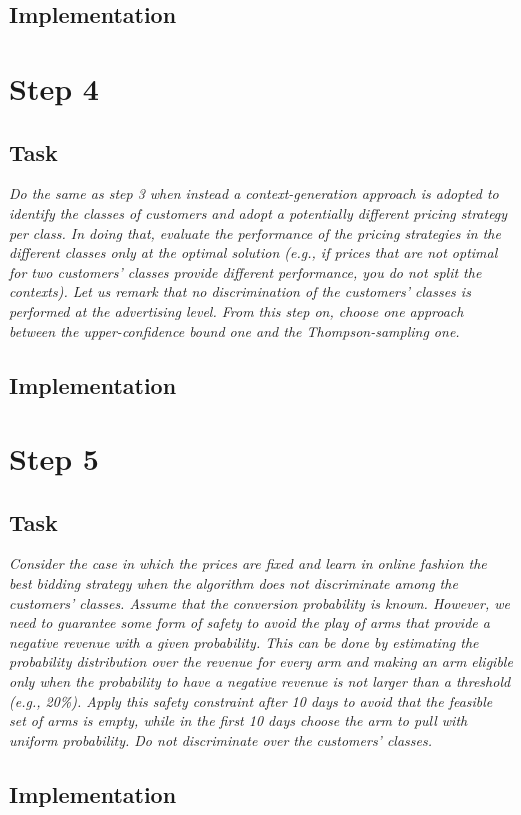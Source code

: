 \documentclass[12pt,a4paper]{report}
\begin{document}
			\subsection{Implementation}

		\section{Step 4}
			\subsection{Task}
\textit{Do the same as step 3 when instead a context-generation approach is adopted to identify the classes of customers and adopt a potentially different pricing strategy per class. In doing that, evaluate the performance of the pricing strategies in the different classes only at the optimal solution (e.g., if prices that are not optimal for two customers’ classes provide different performance, you do not split the contexts). Let us remark that no discrimination of the customers’ classes is performed at the advertising level. From this step on, choose one approach between the upper-confidence bound one and the Thompson-sampling one.}
			\subsection{Implementation}
		\section{Step 5}
			\subsection{Task}
\textit{Consider the case in which the prices are fixed and learn in online fashion the best bidding strategy when the algorithm does not discriminate among the customers’ classes. Assume that the conversion probability is known. However, we need to guarantee some form of safety to avoid the play of arms that provide a negative revenue with a given probability. This can be done by estimating the probability distribution over the revenue for every arm and making an arm eligible only when the probability to have a negative revenue is not larger than a threshold (e.g., 20\%). Apply this safety constraint after 10 days to avoid that the feasible set of arms is empty, while in the first 10 days choose the arm to pull with uniform probability. Do not discriminate over the customers’ classes.}
			\subsection{Implementation}
\end{document}
